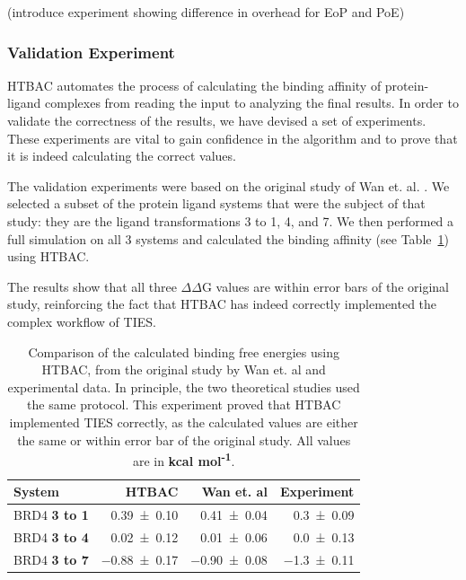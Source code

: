 (introduce experiment showing difference in overhead for EoP and PoE)


\subsubsection{Validation Experiment}


HTBAC automates the process of calculating the binding affinity of
protein-ligand complexes from reading the input to analyzing the final
results. In order to validate the correctness of the results, we have devised
a set of experiments. These experiments are vital to gain confidence in the
algorithm and to prove that it is indeed calculating the correct values.

The validation experiments were based on the original study of Wan et. al.
\cite{Wan2017brd4}. We selected a subset of the protein ligand systems that
were the subject of that study: they are the ligand transformations 3 to 1,
4, and 7. We then performed a full simulation on all 3 systems and calculated
the binding affinity (see Table~\ref{tab:exp2}) using HTBAC.

The results show that all three $\Delta \Delta$G values are within error bars
of the original study, reinforcing the fact that HTBAC has indeed correctly
implemented the complex workflow of TIES.

\begin{table}
  \centering
  \caption{Comparison of the calculated binding free energies using HTBAC,
  from the original study by Wan et. al and experimental data. In principle,
  the two theoretical studies used the same protocol. This experiment proved
  that HTBAC implemented TIES correctly, as the calculated values are either
  the same or within error bar of the original study. All values are in
  \textbf{kcal mol\textsuperscript{-1}}.}
  \begin{tabular}{lrrr}
    \toprule
    System & HTBAC & Wan et. al & Experiment \\
    \midrule
    BRD4 \textbf{3 to 1} & \num{0.39 +- 0.10} &   \num{0.41 +- 0.04} &  \num{0.3 +- 0.09} \\
    BRD4 \textbf{3 to 4} & \num{0.02 +- 0.12} &   \num{0.01 +- 0.06} &  \num{0.0 +- 0.13} \\
    BRD4 \textbf{3 to 7} & \num{-0.88 +- 0.17} &  \num{-0.90 +- 0.08} & \num{-1.3 +- 0.11} \\
    \bottomrule
  \end{tabular}
  \label{tab:exp2}
\end{table}

